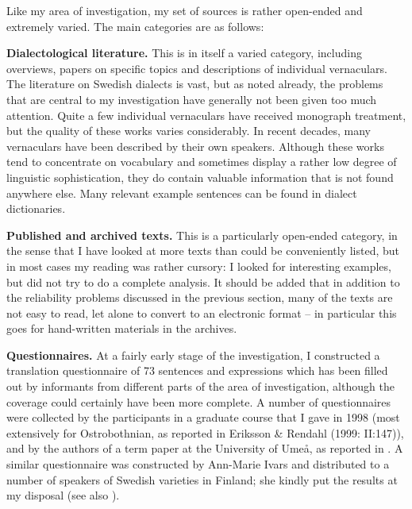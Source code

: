 
\begin{styleBodyTextFirst}
Like my area of investigation, my set of sources is rather open-ended and extremely varied. The main categories are as follows:

\end{styleBodyTextFirst}

\begin{styleBodytextC}
\textbf{Dialectological literature. }This is in itself a varied category, including overviews, papers on specific topics and descriptions of individual vernaculars. The literature on Swedish dialects is vast, but as noted already, the problems that are central to my investigation have generally not been given too much attention. Quite a few individual vernaculars have received monograph treatment, but the quality of these works varies considerably. In recent decades, many vernaculars have been described by their own speakers. Although these works tend to concentrate on vocabulary and sometimes display a rather low degree of linguistic sophistication, they do contain valuable information that is not found anywhere else. Many relevant example sentences can be found in dialect dictionaries. 

\end{styleBodytextC}

\begin{styleBodytextC}
\textbf{Published and archived texts.} This is a particularly open-ended category, in the sense that I have looked at more texts than could be conveniently listed, but in most cases my reading was rather cursory: I looked for interesting examples, but did not try to do a complete analysis. It should be added that in addition to the reliability problems discussed in the previous section, many of the texts are not easy to read, let alone to convert to an electronic format – in particular this goes for hand-written materials in the archives. 

\end{styleBodytextC}

\begin{styleBodytextC}
\textbf{Questionnaires. }At a fairly early stage of the investigation, I constructed a translation questionnaire of 73 sentences and expressions which has been filled out by informants from different parts of the area of investigation, although the coverage could certainly have been more complete. A number of questionnaires were collected by the participants in a graduate course that I gave in 1998 (most extensively for Ostrobothnian, as reported in Eriksson \& Rendahl (1999: II:147)), and by the authors of a term paper at the University of Umeå, as reported in \citet{BergholmEtAl1999}. A similar questionnaire was constructed by Ann-Marie Ivars and distributed to a number of speakers of Swedish varieties in Finland; she kindly put the results at my disposal (see also \citet{Ivars2005}).

\end{styleBodytextC}

